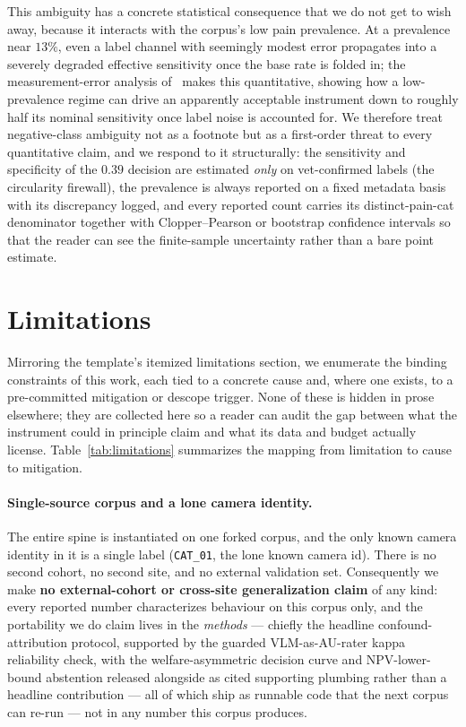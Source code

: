 This ambiguity has a concrete statistical consequence that we do not get to wish
away, because it interacts with the corpus's low pain prevalence. At a
prevalence near $13\%$, even a label channel with seemingly modest error
propagates into a severely degraded effective sensitivity once the base rate is
folded in; the measurement-error analysis of~\cite{chavoshi2025} makes this
quantitative, showing how a low-prevalence regime can drive an apparently
acceptable instrument down to roughly half its nominal sensitivity once
label noise is accounted for. We therefore treat negative-class ambiguity not as
a footnote but as a first-order threat to every quantitative claim, and we
respond to it structurally: the sensitivity and specificity of the $0.39$
decision are estimated \emph{only} on vet-confirmed labels (the circularity
firewall), the prevalence is always reported on a fixed metadata basis with its
discrepancy logged, and every reported count carries its distinct-pain-cat
denominator together with Clopper--Pearson or bootstrap confidence intervals so
that the reader can see the finite-sample uncertainty rather than a bare point
estimate.

\section{Limitations}
\label{sec:limitations}

Mirroring the template's itemized limitations section, we enumerate the binding
constraints of this work, each tied to a concrete cause and, where one exists,
to a pre-committed mitigation or descope trigger. None of these is hidden in
prose elsewhere; they are collected here so a reader can audit the gap between
what the instrument could in principle claim and what its data and budget
actually license. Table~\ref{tab:limitations} summarizes the mapping from
limitation to cause to mitigation.

\paragraph{Single-source corpus and a lone camera identity.}
The entire spine is instantiated on one forked corpus, and the only known camera
identity in it is a single label (\texttt{CAT\_01}, the lone known camera id).
There is no second cohort, no second site, and no external validation set.
Consequently we make \textbf{no external-cohort or cross-site generalization
claim} of any kind: every reported number characterizes behaviour on this
corpus only, and the portability we do claim lives in the \emph{methods} ---
chiefly the headline confound-attribution protocol, supported by the guarded
VLM-as-AU-rater kappa reliability check, with the welfare-asymmetric decision
curve and NPV-lower-bound abstention released alongside as cited supporting
plumbing rather than a headline contribution --- all of which ship as runnable code
that the next corpus can re-run --- not in any number
this corpus produces.

